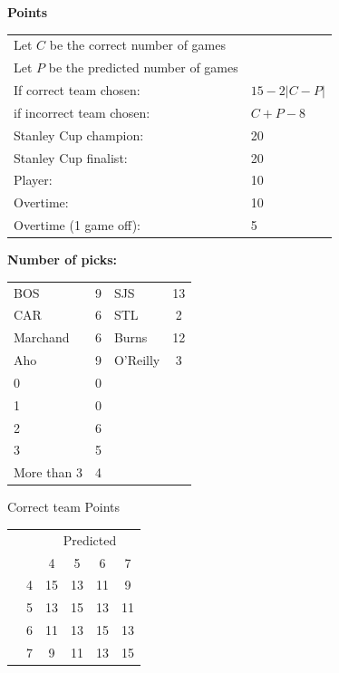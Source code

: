 \documentclass[10pt]{article}
\newcommand{\mccn}[2]{\multicolumn{#1}{c}{#2}}
\begin{document}
{\bf Points}\\
\begin{minipage}{10cm}
    \begin{tabular}{l l}
        Let $C$ be the correct number of games\\
        Let $P$ be the predicted number of games\\
        If correct team chosen:	   & $15 - 2 \left|{C - P}\right|$\\
        if incorrect team chosen:  & $C + P - 8$\\
        Stanley Cup champion:	& 20\\
        Stanley Cup finalist:	& 20\\
        Player:                 & 10\\
        Overtime:               & 10\\
        Overtime (1 game off):  & 5\\
    \end{tabular}

    \vspace{1cm}
    {\bf Number of picks:}\\
    \begin{tabular}{lc | lc }
        BOS & 9 & SJS & 13 \\
        CAR & 6 & STL & 2 \\
        Marchand & 6 & Burns & 12 \\
        Aho & 9 & O'Reilly & 3 \\
        \rule{0pt}{3.5ex}0 & 0 & & \\
        1 & 0 & & \\
        2 & 6 & & \\
        3 & 5 & & \\
        More than 3 & 4 & & 
    \end{tabular}
\end{minipage}
\begin{minipage}[t!]{4cm}
    \vspace{-2cm}
    \qquad Correct team Points\\
    \begin{tabular}{c l | c c c c }
        \mccn{2}{} & \mccn{4}{Predicted}\\
        & & 4 & 5 & 6 & 7\\\cline{2-6}
        \parbox[t]{2mm}{} & 4 & 15 & 13 & 11 & 9\\
        & 5 & 13 & 15 & 13 & 11\\
        & 6 & 11 & 13 & 15 & 13\\
        & 7 & 9 & 11 & 13 & 15
    \end{tabular}
\end{minipage}
\end{document}
